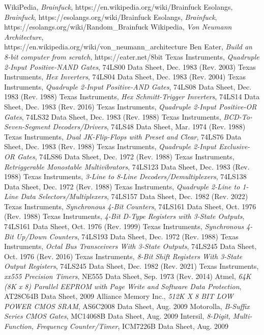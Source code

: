 \begin{thebibliography}{99} \label{resources}
 WikiPedia, \emph{Brainfuck}, https://en.wikipedia.org/wiki/Brainfuck
 Esolangs, \emph{Brainfuck}, https://esolangs.org/wiki/Brainfuck
 Esolangs, \emph{Brainfuck}, https://esolangs.org/wiki/Random\_Brainfuck
 Wikipedia, \emph{Von Neumann Architecture},\\https://en.wikipedia.org/wiki/von\_neumann\_architecture
 Ben Eater, \emph{Build an 8-bit computer from scratch}, https://eater.net/8bit
 Texas Instruments, \emph{Quadruple 2-Input Positive-NAND Gates}, 74LS00 Data Sheet, Dec. 1983 (Rev. 2003)
 Texas Instruments, \emph{Hex Inverters}, 74LS04 Data Sheet, Dec. 1983 (Rev. 2004)
 Texas Instruments, \emph{Quadruple 2-Input Positive-AND Gates}, 74LS08 Data Sheet, Dec. 1983 (Rev. 1988)
 Texas Instruments, \emph{Hex Schmitt-Trigger Inverters}, 74LS14 Data Sheet, Dec. 1983 (Rev. 2016)
 Texas Instruments, \emph{Quadruple 2-Input Positive-OR Gates}, 74LS32 Data Sheet, Dec. 1983 (Rev. 1988)
 Texas Instruments, \emph{BCD-To-Seven-Segment Decoders/Drivers}, 74LS48 Data Sheet, Mar. 1974 (Rev. 1988)
 Texas Instruments, \emph{Dual JK-Flip-Flops with Preset and Clear}, 74LS76 Data Sheet, Dec. 1983 (Rev. 1988)
 Texas Instruments, \emph{Quadruple 2-Input Exclusive-OR Gates}, 74LS86 Data Sheet, Dec. 1972 (Rev. 1988)
 Texas Instruments, \emph{Retriggerable Monostable Multivibrators}, 74LS123 Data Sheet, Dec. 1983 (Rev. 1988)
 Texas Instruments, \emph{3-Line to 8-Line Decoders/Demultiplexers}, 74LS138 Data Sheet, Dec. 1972 (Rev. 1988)
 Texas Instruments, \emph{Quadruple 2-Line to 1-Line Data Selectors/Multiplexers}, 74LS157 Data Sheet, Dec. 1982 (Rev. 2022)
 Texas Instruments, \emph{Synchronous 4-Bit Counters}, 74LS161 Data Sheet, Oct. 1976 (Rev. 1988)
 Texas Instruments, \emph{4-Bit D-Type Registers with 3-State Outputs}, 74LS161 Data Sheet, Oct. 1976 (Rev. 1999)
 Texas Instruments, \emph{Synchronous 4-Bit Up/Down Counters}, 74LS193 Data Sheet, Dec. 1972 (Rev. 1988)
 Texas Instruments, \emph{Octal Bus Transceivers With 3-State Outputs}, 74LS245 Data Sheet, Oct. 1976 (Rev. 2016)
 Texas Instruments, \emph{8-Bit Shift Registers With 3-State Output Registers}, 74LS245 Data Sheet, Dec. 1982 (Rev. 2021)
 Texas Instruments, \emph{xx555 Precision Timers}, NE555 Data Sheet, Sep. 1973 (Rev. 2014)
 Atmel, \emph{64K (8K x 8) Parallel EEPROM with Page Write and Software Data Protection}, AT28C64B Data Sheet, 2009
 Alliance Memory Inc., \emph{512K X 8 BIT LOW POWER CMOS SRAM}, AS6C2008 Data Sheet, Aug. 2009
 Motorolla, \emph{B-Suffix Series CMOS Gates}, MC14068B Data Sheet, Aug. 2009
 Intersil, \emph{8-Digit, Multi-Function, Frequency Counter/Timer}, ICM7226B Data Sheet, Aug. 2009
  

\end{thebibliography}
